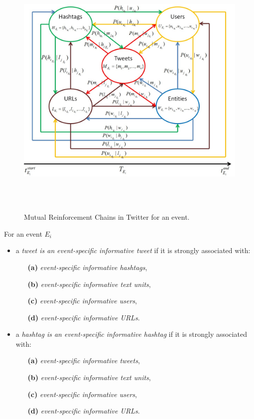 \begin{figure}[htbp]
\centering
\caption{\small Mutual Reinforcement Chains in Twitter for an event.}    
\includegraphics[width=16cm,height=12cm]{Figures/TwitterEventInfoGraph.jpg}
\label{mrc}
\end{figure}








For an event $E_{i}$ 
\begin{itemize} 
\item a \textit{tweet is an event-specific informative tweet} if it is strongly associated with:
\begin{itemize}
\item[\textbf{(a)}] \textit{event-specific informative hashtags}, 
\item[\textbf{(b)}] \textit{event-specific informative text units}, 
\item[\textbf{(c)}] \textit{event-specific informative users},
\item[\textbf{(d)}] \textit{event-specific informative URLs}. 
\end{itemize}
\end{itemize}

\begin{itemize} 
\item a \textit{hashtag is an event-specific informative hashtag} if it is strongly associated with:
\begin{itemize}
\item[\textbf{(a)}] \textit{event-specific informative tweets},
\item[\textbf{(b)}] \textit{event-specific informative text units},
\item[\textbf{(c)}] \textit{event-specific informative users},
\item[\textbf{(d)}] \textit{event-specific informative URLs}.
\end{itemize}
\end{itemize}


